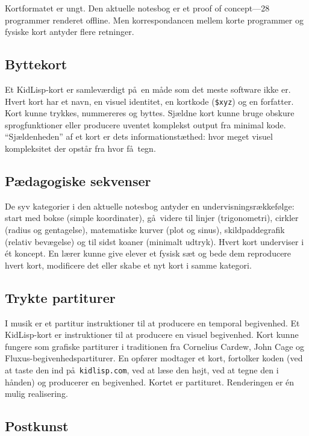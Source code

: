 \documentclass[10pt,letterpaper,twocolumn]{article}
\begin{document}
Kortformatet er ungt. Den aktuelle notesbog er et proof of concept---28 programmer renderet offline. Men korrespondancen mellem korte programmer og fysiske kort antyder flere retninger.

\subsection{Byttekort}

Et KidLisp-kort er samlev\ae rdigt p\aa\ en m\aa de som det meste software ikke er. Hvert kort har et navn, en visuel identitet, en kortkode (\texttt{\$xyz}) og en forfatter. Kort kunne trykkes, nummereres og byttes. Sj\ae ldne kort kunne bruge obskure sprogfunktioner eller producere uventet komplekst output fra minimal kode. ``Sj\ae ldenheden'' af et kort er dets informationst\ae thed: hvor meget visuel kompleksitet der opst\aa r fra hvor f\aa\ tegn.

\subsection{P\ae dagogiske sekvenser}

De syv kategorier i den aktuelle notesbog antyder en undervisningsr\ae kkef\o lge: start med bokse (simple koordinater), g\aa\ videre til linjer (trigonometri), cirkler (radius og gentagelse), matematiske kurver (plot og sinus), skildpaddegrafik (relativ bev\ae gelse) og til sidst koaner (minimalt udtryk). Hvert kort underviser i \'{e}t koncept. En l\ae rer kunne give elever et fysisk s\ae t og bede dem reproducere hvert kort, modificere det eller skabe et nyt kort i samme kategori.

\subsection{Trykte partiturer}

I musik er et partitur instruktioner til at producere en temporal begivenhed. Et KidLisp-kort er instruktioner til at producere en visuel begivenhed. Kort kunne fungere som grafiske partiturer i traditionen fra Cornelius Cardew, John Cage og Fluxus-begivenhedspartiturer. En opf\o rer modtager et kort, fortolker koden (ved at taste den ind p\aa\ \texttt{kidlisp.com}, ved at l\ae se den h\o jt, ved at tegne den i h\aa nden) og producerer en begivenhed. Kortet er partituret. Renderingen er \'{e}n mulig realisering.

\subsection{Postkunst}
\end{document}
